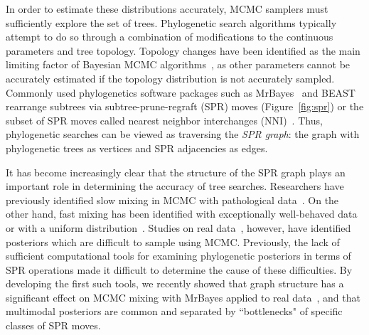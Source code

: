 \documentclass[]{elsarticle}
\begin{document}
In order to estimate these distributions accurately, MCMC samplers must sufficiently explore the set of trees.
Phylogenetic search algorithms typically attempt to do so through a combination of modifications to the continuous parameters and tree topology.
Topology changes have been identified as the main limiting factor of Bayesian MCMC algorithms~\citep{lakner2008efficiency,hohna2012guided}, as other parameters cannot be accurately estimated if the topology distribution is not accurately sampled.
Commonly used phylogenetics software packages such as MrBayes~\citep{Ronquist2012-hi} and BEAST~\citep{bouckaert2014beast} rearrange subtrees via subtree-prune-regraft (SPR) moves (Figure~\ref{fig:spr}) or the subset of SPR moves called nearest neighbor interchanges (NNI)~\citep{robinson1971comparison}.
Thus, phylogenetic searches can be viewed as traversing the \emph{SPR graph}: the graph with phylogenetic trees as vertices and SPR adjacencies as edges.

It has become increasingly clear that the structure of the SPR graph plays an important role in determining the accuracy of tree searches.
Researchers have previously identified slow mixing in MCMC with pathological data~\citep{Mossel2005-ly,Mossel2006-fo,Ronquist2006-fv}.
On the other hand, fast mixing has been identified with exceptionally well-behaved data~\citep{Stefankovic2011-hu} or with a uniform distribution~\citep{spade2014note}.
Studies on real data~\citep{beiko2006searching, lakner2008efficiency}, however, have identified posteriors which are difficult to sample using MCMC.
Previously, the lack of sufficient computational tools for examining phylogenetic posteriors in terms of SPR operations made it difficult to determine the cause of these difficulties.
By developing the first such tools, we recently showed that graph structure has a significant effect on MCMC mixing with MrBayes applied to real data~\citep{Whidden2015-yi}, and that multimodal posteriors are common and separated by ``bottlenecks" of specific classes of SPR moves.
\end{document}

